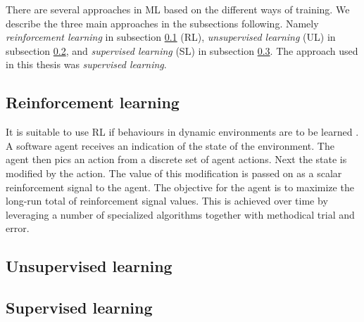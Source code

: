 There are several approaches in ML based on the different ways of training. We describe the three main approaches in the subsections following. Namely \textit{reinforcement learning} in subsection \ref{reinforcementLearning} (RL), \textit{unsupervised learning} (UL) in subsection \ref{unsupervisedLearning}, and \textit{supervised learning} (SL) in subsection \ref{supervisedLearning}. The approach used in this thesis was \textit{supervised learning}. 

\subsection{Reinforcement learning} \label{reinforcementLearning}
It is suitable to use RL if behaviours in dynamic environments are to be learned \cite{reinforcementLearningIntroduction}. A software agent receives an indication of the state of the environment. The agent then pics an action from a discrete set of agent actions. Next the state is modified by the action. The value of this modification is passed on as a scalar reinforcement signal to the agent. The objective for the agent is to maximize the long-run total of reinforcement signal values. This is achieved over time by leveraging a number of specialized algorithms together with methodical trial and error.

\subsection{Unsupervised learning} \label{unsupervisedLearning}


\subsection{Supervised learning} \label{supervisedLearning}

